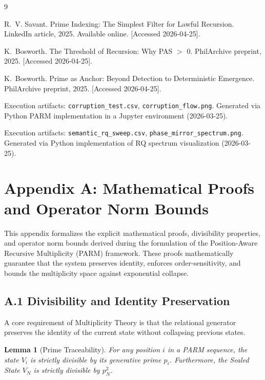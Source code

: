 \documentclass[11pt]{article}
\begin{document}

\begin{thebibliography}{9}

R.~V. Savant.
\newblock Prime Indexing: The Simplest Filter for Lawful Recursion.
\newblock LinkedIn article, 2025. Available online. [Accessed 2026-04-25]. 

K.~Bosworth.
\newblock The Threshold of Recursion: Why PAS $>$ 0.
\newblock PhilArchive preprint, 2025. [Accessed 2026-04-25].

K.~Bosworth.
\newblock Prime as Anchor: Beyond Detection to Deterministic Emergence.
\newblock PhilArchive preprint, 2025. [Accessed 2026-04-25].

Execution artifacts: \texttt{corruption\_test.csv}, \texttt{corruption\_flow.png}.
\newblock Generated via Python PARM implementation in a Jupyter environment (2026-03-25).

Execution artifacts: \texttt{semantic\_rq\_sweep.csv}, \texttt{phase\_mirror\_spectrum.png}.
\newblock Generated via Python implementation of RQ spectrum visualization (2026-03-25).

\end{thebibliography}

\appendix
\section*{Appendix A: Mathematical Proofs and Operator Norm Bounds}

This appendix formalizes the explicit mathematical proofs, divisibility properties, and operator norm bounds derived during the formulation of the Position-Aware Recursive Multiplicity (PARM) framework. These proofs mathematically guarantee that the system preserves identity, enforces order-sensitivity, and bounds the multiplicity space against exponential collapse.

\subsection*{A.1 Divisibility and Identity Preservation}

A core requirement of Multiplicity Theory is that the relational generator preserves the identity of the current state without collapsing previous states.

\newtheorem{lemma}{Lemma}[section]
\begin{lemma}[Prime Traceability]
For any position $i$ in a PARM sequence, the state $V_i$ is strictly divisible by its generative prime $p_i$. Furthermore, the Sealed State $V_N$ is strictly divisible by $p_N^2$.
\end{lemma}
\end{document}
